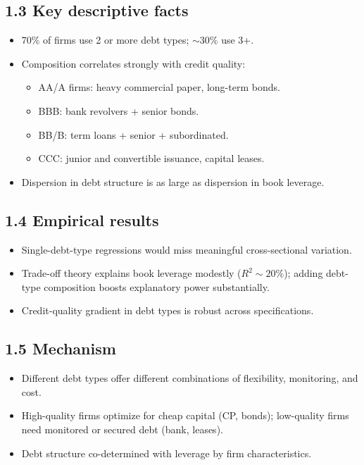 \documentclass[11pt]{article}
\begin{document}
\subsection*{1.3 Key descriptive facts}
\begin{itemize}
\item 70\% of firms use 2 or more debt types; $\sim$30\% use 3+.
\item Composition correlates strongly with credit quality:
\begin{itemize}
\item AA/A firms: heavy commercial paper, long-term bonds.
\item BBB: bank revolvers + senior bonds.
\item BB/B: term loans + senior + subordinated.
\item CCC: junior and convertible issuance, capital leases.
\end{itemize}
\item Dispersion in debt structure is as large as dispersion in book leverage.
\end{itemize}

\subsection*{1.4 Empirical results}
\begin{itemize}
\item Single-debt-type regressions would miss meaningful cross-sectional variation.
\item Trade-off theory explains book leverage modestly ($R^2 \sim 20\%$); adding debt-type composition boosts explanatory power substantially.
\item Credit-quality gradient in debt types is robust across specifications.
\end{itemize}

\subsection*{1.5 Mechanism}
\begin{itemize}
\item Different debt types offer different combinations of flexibility, monitoring, and cost.
\item High-quality firms optimize for cheap capital (CP, bonds); low-quality firms need monitored or secured debt (bank, leases).
\item Debt structure co-determined with leverage by firm characteristics.
\end{itemize}
\end{document}
